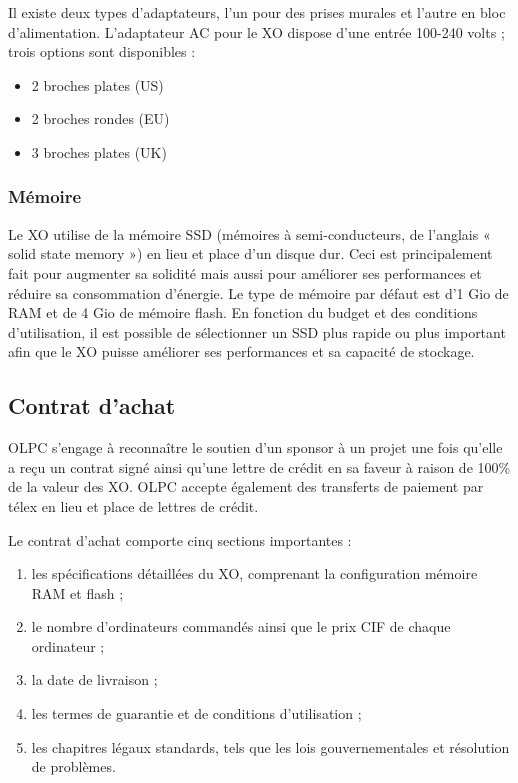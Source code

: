 \documentclass[12pt]{article}
\begin{document}
Il existe deux types d'adaptateurs, l'un pour des prises murales et l'autre
en bloc d'alimentation. L'adaptateur AC pour le XO dispose d'une entrée
100-240 volts ; trois options sont disponibles :

\begin{itemize}
\item 2 broches plates (US)
\item 2 broches rondes (EU)
\item 3 broches plates (UK)
\end{itemize}
\subsubsection{Mémoire}
\label{sec-8-1-3}



Le XO utilise de la mémoire SSD (mémoires à semi-conducteurs, de l'anglais
« solid state memory ») en lieu et place d'un disque dur. Ceci est
principalement fait pour augmenter sa solidité mais aussi pour améliorer
ses performances et réduire sa consommation d'énergie. Le type de mémoire
par défaut est d'1 Gio de RAM et de 4 Gio de mémoire flash. En fonction du
budget et des conditions d'utilisation, il est possible de sélectionner un
SSD plus rapide ou plus important afin que le XO puisse améliorer ses
performances et sa capacité de stockage.
\subsection{Contrat d'achat}
\label{sec-8-2}


OLPC s'engage à reconnaître le soutien d'un sponsor à un projet une fois
qu'elle a reçu un contrat signé ainsi qu'une lettre de crédit en sa faveur
à raison de 100\% de la valeur des XO. OLPC accepte également des
transferts de paiement par télex en lieu et place de lettres de crédit.

Le contrat d'achat comporte cinq sections importantes :

\begin{enumerate}
\item les spécifications détaillées du XO, comprenant la configuration mémoire
   RAM et flash ;
\item le nombre d'ordinateurs commandés ainsi que le prix CIF de chaque
   ordinateur ;
\item la date de livraison ;
\item les termes de guarantie et de conditions d'utilisation ;
\item les chapitres légaux standards, tels que les lois gouvernementales et
   résolution de problèmes.
\end{enumerate}
\end{document}
